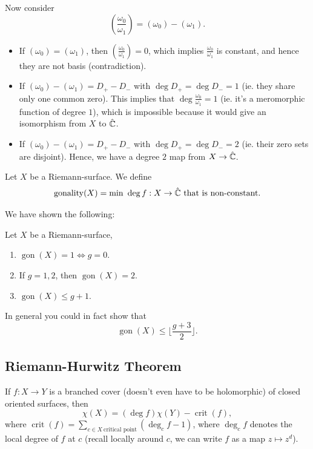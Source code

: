 \documentclass{article}
\begin{document}
{\begin{enumerate}
    Now consider
    \[(\frac{\omega_0}{\omega_1}) = (\omega_0) - (\omega_1).\]
\begin{itemize}
    \item If $(\omega_0) = (\omega_1)$, then $(\frac{\omega_0}{\omega_1}) = 0$, which implies $\frac{\omega_0}{\omega_1}$ is constant, and hence they are not basis (contradiction).
    \item If $(\omega_0) - (\omega_1) = D_+ - D_-$ with $\deg D_+ = \deg D_- = 1$ (ie. they share only one common zero). This implies that $\deg \frac{\omega_0}{\omega_1} = 1$ (ie. it's a meromorphic function of degree $1$), which is impossible because it would give an isomorphism from $X$ to $\hat{\mathbb{C}}$.
    \item If $(\omega_0) - (\omega_1) = D_+ - D_-$ with $\deg D_+ = \deg D_- = 2$ (ie. their zero sets are disjoint). Hence, we have a degree $2$ map from $X \to \hat{\mathbb{C}}$.
\end{itemize}
\end{enumerate}

\begin{definition}
    Let $X$ be a Riemann-surface. We define
    \[\operatorname{gonality}(X) = \min\ \deg f: X \to \hat{\mathbb{C}} \text{ that is non-constant}.\]
\end{definition}

We have shown the following:
\begin{proposition}
Let $X$ be a Riemann-surface,
\begin{enumerate}
    \item $\operatorname{gon}(X) = 1 \iff g = 0$.
    \item If $g = 1, 2$, then $\operatorname{gon}(X) = 2$.
    \item $\operatorname{gon}(X) \leq g + 1$.
\end{enumerate}
\end{proposition}

\begin{remark}
    In general you could in fact show that
    \[\operatorname{gon}(X) \leq \lfloor \frac{g+3}{2} \rfloor.\]
\end{remark}

\subsection{Riemann-Hurwitz Theorem}

\begin{theorem}
    If $f: X \to Y$ is a branched cover (doesn't even have to be holomorphic) of closed oriented surfaces, then 
    \[\chi(X) = (\deg f) \chi(Y) - \operatorname{crit}(f),\]
    where $\operatorname{crit}(f) = \sum_{c \in X\ \text{critical point}} (\deg_c f - 1)$, where $\deg_c f$ denotes the local degree of $f$ at $c$ (recall locally around $c$, we can write $f$ as a map $z \mapsto z^d$).
\end{theorem}

}
\end{document}
